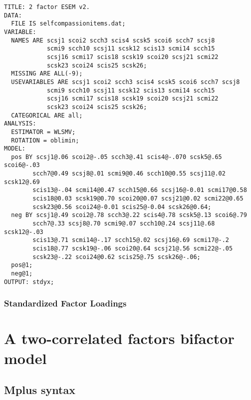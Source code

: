 \documentclass[aps,floatfix,prl]{revtex4}
\begin{document}
\begin{verbatim}
TITLE: 2 factor ESEM v2.
DATA:
  FILE IS selfcompassionitems.dat;
VARIABLE:
  NAMES ARE scsj1 scoi2 scch3 scis4 scsk5 scoi6 scch7 scsj8 
            scmi9 scch10 scsj11 scsk12 scis13 scmi14 scch15 
            scsj16 scmi17 scis18 scsk19 scoi20 scsj21 scmi22 
            scsk23 scoi24 scis25 scsk26; 
  MISSING ARE ALL(-9);
  USEVARIABLES ARE scsj1 scoi2 scch3 scis4 scsk5 scoi6 scch7 scsj8 
            scmi9 scch10 scsj11 scsk12 scis13 scmi14 scch15 
            scsj16 scmi17 scis18 scsk19 scoi20 scsj21 scmi22 
            scsk23 scoi24 scis25 scsk26; 
  CATEGORICAL ARE all;
ANALYSIS: 
  ESTIMATOR = WLSMV; 
  ROTATION = oblimin; 
MODEL:
  pos BY scsj1@.06 scoi2@-.05 scch3@.41 scis4@-.070 scsk5@.65 scoi6@-.03 
        scch7@0.49 scsj8@.01 scmi9@0.46 scch10@0.55 scsj11@.02 scsk12@.69 
        scis13@-.04 scmi14@0.47 scch15@0.66 scsj16@-0.01 scmi17@0.58 
        scis18@0.03 scsk19@0.70 scoi20@0.07 scsj21@0.02 scmi22@0.65 
        scsk23@0.56 scoi24@-0.01 scis25@-0.04 scsk26@0.64;
  neg BY scsj1@.49 scoi2@.78 scch3@.22 scis4@.78 scsk5@.13 scoi6@.79 
        scch7@.33 scsj8@.70 scmi9@.07 scch10@.24 scsj11@.68 scsk12@-.03 
        scis13@.71 scmi14@-.17 scch15@.02 scsj16@.69 scmi17@-.2 
        scis18@.77 scsk19@-.06 scoi20@.64 scsj21@.56 scmi22@-.05 
        scsk23@-.22 scoi24@0.62 scis25@.75 scsk26@-.06;
  pos@1;
  neg@1;
OUTPUT: stdyx;
\end{verbatim}

\newpage

\hypertarget{standardized-factor-loadings-1}{%
\subsubsection{Standardized Factor
Loadings}\label{standardized-factor-loadings-1}}



\newpage

\hypertarget{a-two-correlated-factors-bifactor-model}{%
\section{A two-correlated factors bifactor
model}\label{a-two-correlated-factors-bifactor-model}}

\hypertarget{mplus-syntax-1}{%
\subsection{Mplus syntax}\label{mplus-syntax-1}}
\end{document}

